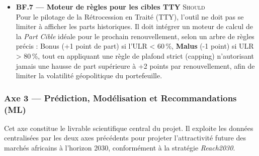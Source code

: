 \documentclass[12pt,a4paper]{report}
\begin{document}
\begin{itemize}[leftmargin=1.5cm, itemsep=5pt]
  \item \textbf{BF.7 --- Moteur de règles pour les cibles TTY} \hfill \textsc{Should} \\ Pour le pilotage de la Rétrocession en Traité (TTY), l'outil ne doit pas se limiter à afficher les parts historiques. Il doit intégrer un moteur de calcul de la \textit{Part Cible} idéale pour le prochain renouvellement, selon un arbre de règles précis : Bonus (+1 point de part) si l'ULR < 60\,\%, \textbf{Malus} (-1 point) si ULR > 80\,\%, tout en appliquant une règle de plafond strict (capping) n'autorisant jamais une hausse de part supérieure à +2 points par renouvellement, afin de limiter la volatilité géopolitique du portefeuille.
\end{itemize}

\subsubsection{Axe 3 --- Prédiction, Modélisation et Recommandations (ML)}

Cet axe constitue le livrable scientifique central du projet. Il exploite les données centralisées par les deux axes précédents pour projeter l'attractivité future des marchés africains à l'horizon 2030, conformément à la stratégie \textit{Reach2030}.
\end{document}
